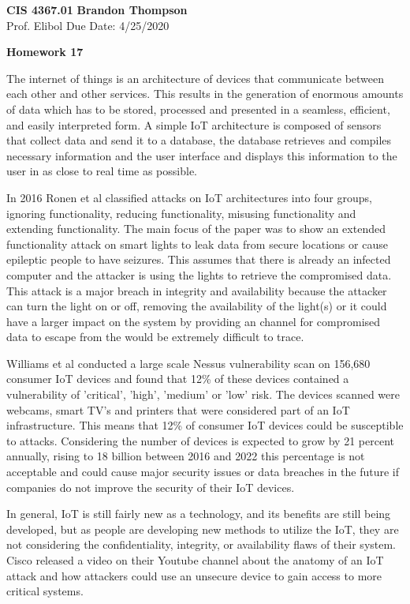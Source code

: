 \documentclass[12pt]{article}
\begin{document}
\noindent
\textbf{CIS 4367.01} \hfill \textbf{Brandon Thompson} \\
\normalsize Prof. Elibol \hfill Due Date: 4/25/2020 \\

\begin{center}
\textbf{Homework 17}
\end{center}

	\doublespacing

	The internet of things is an architecture of devices that communicate between 
	each other and other services. This results in the generation of enormous amounts
	of data which has to be stored, processed and presented in a seamless, efficient,
	and easily interpreted form. \cite{gubbi} A simple IoT architecture is composed
	of sensors that collect data and send it to a database, the database retrieves
	and compiles necessary information and the user interface and displays this information
	to the user in as close to real time as possible.

	In 2016 Ronen et al \cite{ronen} classified attacks on IoT architectures into four groups,
	ignoring functionality, reducing functionality, misusing functionality and extending
	functionality. The main focus of the paper was to show an extended functionality attack
	on smart lights to leak data from secure locations or cause epileptic people to have
	seizures. This assumes that there is already an infected computer and the attacker is
	using the lights to retrieve the compromised data. This attack is a major breach in
	integrity and availability because the attacker can turn the light on or off, removing
	the availability of the light(s) or it could have a larger impact on the system by providing
	an channel for compromised data to escape from the would be extremely difficult to trace.

	Williams et al \cite{williams} conducted a large scale Nessus vulnerability scan on 156,680
	consumer IoT devices and found that 12\% of these devices contained a vulnerability of
	'critical', 'high', 'medium' or 'low' risk. The devices scanned were webcams, smart TV's
	and printers that were considered part of an IoT infrastructure. This means that 12\% of
	consumer IoT devices could be susceptible to attacks. Considering the number of devices
	is expected to grow by 21 percent annually, rising to 18 billion between 2016 and 2022
	\cite{ericson}
	this percentage is not acceptable and could cause major security issues or data breaches
	in the future if companies do not improve the security of their IoT devices.

	In general, IoT is still fairly new as a technology, and its benefits are still being
	developed, but as people are developing new methods to utilize the IoT, they are not
	considering the confidentiality, integrity, or availability flaws of their system.
	Cisco released a video on their Youtube channel \cite{cisco} about the anatomy of an
	IoT attack and how attackers could use an unsecure device to gain access to more critical
	systems.

	\newpage

	\printbibliography
\end{document}
